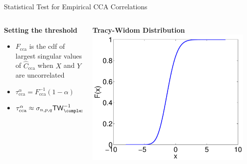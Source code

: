 \documentclass[8pt]{beamer}
\newcommand{\twc}{{\sf TW}_\complex}
\newcommand{\Cccahat}{\widehat{C}_{\text{cca}}}
\begin{document}
\begin{frame}{Statistical Test for Empirical CCA Correlations}
  \begin{columns}[T]
    \begin{column}{0.6\textwidth}
      \textbf{Setting the threshold}
      \begin{itemize}
      \item $F_{\text{cca}}$ is the cdf of largest singular values of $\Cccahat$ when $X$
        and $Y$ are uncorrelated
      \item $\tau_{\text{cca}}^{\alpha} = F_{\text{cca}}^{-1}(1-\alpha)$ 
      \item $\tau_{\text{cca}}^{\alpha} \approx \sigma_{n,p,q}\twc^{-1}(1-\alpha) + \mu_{n,p,q}$
      \end{itemize}
    \end{column}
    \begin{column}{0.4\textwidth} 
      \centering
      \textbf{Tracy-Widom Distribution}\\
      \includegraphics[width=0.95\textwidth]{figures/tw.pdf}
    \end{column}
  \end{columns} 
\end{frame}
\end{document}
